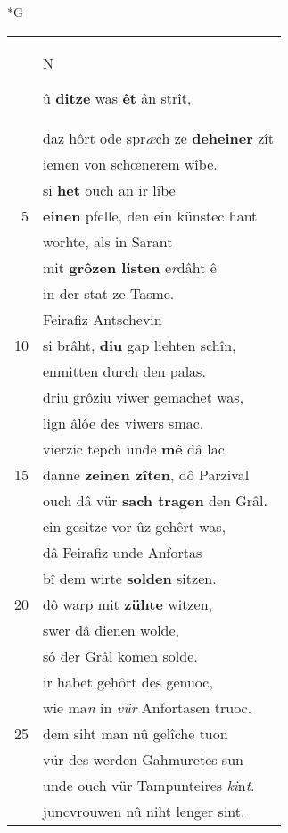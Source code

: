 \documentclass[8pt,a4paper,notitlepage]{article}
\begin{document}
\begin{table}[ht]
\begin{minipage}[t]{0.5\linewidth}
\small
\begin{center}*G
\end{center}
\begin{tabular}{rl}
 & \begin{large}N\end{large}û \textbf{ditze} was \textbf{êt} ân strît,\\ 
 & daz hôrt ode spr\textit{æ}ch ze \textbf{deheiner} zît\\ 
 & iemen von schœnerem wîbe.\\ 
 & si \textbf{het} ouch an ir lîbe\\ 
5 & \textbf{einen} pfelle, den ein künstec hant\\ 
 & worhte, als in Sarant\\ 
 & mit \textbf{grôzen listen} e\textit{r}dâht ê\\ 
 & in der stat ze Tasme.\\ 
 & Feirafiz Antschevin\\ 
10 & si brâht, \textbf{diu} gap liehten schîn,\\ 
 & enmitten durch den palas.\\ 
 & driu grôziu viwer gemachet was,\\ 
 & lign âlôe des viwers smac.\\ 
 & vierzic tepch unde \textbf{mê} dâ lac\\ 
15 & danne \textbf{zeinen zîten}, dô Parzival\\ 
 & ouch dâ vür \textbf{sach tragen} den Grâl.\\ 
 & ein gesitze vor ûz gehêrt was,\\ 
 & dâ Feirafiz unde Anfortas\\ 
 & bî dem wirte \textbf{solden} sitzen.\\ 
20 & dô warp mit \textbf{zühte} witzen,\\ 
 & swer dâ dienen wolde,\\ 
 & sô der Grâl komen solde.\\ 
 & ir habet gehôrt des genuoc,\\ 
 & wie ma\textit{n} in \textit{vür} Anfortasen truoc.\\ 
25 & dem siht man nû gelîche tuon\\ 
 & vür des werden Gahmuretes sun\\ 
 & unde ouch vür Tampunteires \textit{ki}n\textit{t}.\\ 
 & juncvrouwen nû niht lenger sint.\\ 

\end{tabular}
\end{minipage}
\end{table}
\end{document}
